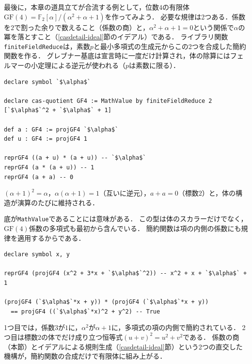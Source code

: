 最後に，本章の道具立てが合流する例として，位数$4$の有限体$\mathrm{GF}(4) = \mathbb{F}_2[\alpha]/(\alpha^2+\alpha+1)$を作ってみよう．
必要な規律は2つある．係数を$2$で割った余りで数えること（係数の商）と，$\alpha^2 + \alpha + 1 = 0$という関係で$\alpha$の冪を落とすこと（\ref{casdetail-ideal}節のイデアル）である．
ライブラリ関数\lstinline{finiteFieldReduce}は，素数$p$と最小多項式の生成元からこの2つを合成した簡約関数を作る．
グレブナー基底は宣言時に一度だけ計算され，体の除算にはフェルマーの小定理による逆元が使われる（$p$は素数に限る）．
\begin{lstlisting}[language=egison,numbers=none]
declare symbol `$\alpha$`

declare cas-quotient GF4 := MathValue by finiteFieldReduce 2 [`$\alpha$`^2 + `$\alpha$` + 1]

def a : GF4 := projGF4 `$\alpha$`
def u : GF4 := projGF4 1

reprGF4 ((a + u) * (a + u)) -- `$\alpha$`
reprGF4 (a * (a + u)) -- 1
reprGF4 (a + a) -- 0
\end{lstlisting}
$(\alpha+1)^2 = \alpha$，$\alpha(\alpha+1) = 1$（互いに逆元），$a + a = 0$（標数$2$）と，体の構造が演算のたびに維持される．

底が\lstinline{MathValue}であることには意味がある．
この型は体のスカラーだけでなく，$\mathrm{GF}(4)$係数の多項式も最初から含んでいる．
簡約関数は項の内側の係数にも規律を適用するからである．
\begin{lstlisting}[language=egison,numbers=none]
declare symbol x, y

reprGF4 (projGF4 (x^2 + 3*x + `$\alpha$`^2)) -- x^2 + x + `$\alpha$` + 1

(projGF4 (`$\alpha$`*x + y)) * (projGF4 (`$\alpha$`*x + y))
  == projGF4 ((`$\alpha$`*x)^2 + y^2) -- True
\end{lstlisting}
1つ目では，係数$3$が$1$に，$\alpha^2$が$\alpha + 1$に，多項式の項の内側で簡約されている．
2つ目は標数$2$の体でだけ成り立つ恒等式$(u+v)^2 = u^2 + v^2$である．
係数の商（本節）とイデアルによる規則生成（\ref{casdetail-ideal}節）という2つの直交した機構が，簡約関数の合成だけで有限体に組み上がる．

